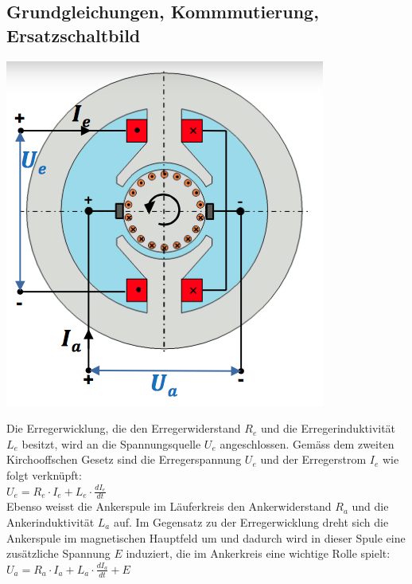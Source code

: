 \subsection{Grundgleichungen, Kommmutierung, Ersatzschaltbild}
\begin{minipage}{0.3 \linewidth}
\includegraphics[width = \linewidth]{./Pics/VL45/GSM}
\end{minipage}
\begin{minipage}{0.6\linewidth}
Die Erregerwicklung, die den Erregerwiderstand $R_e$ und die Erregerinduktivität $L_e$ besitzt, wird an die Spannungsquelle $U_e$ angeschlossen. Gemäss dem zweiten Kirchooffschen Gesetz sind die Erregerspannung $U_e$ und der Erregerstrom $I_e$ wie folgt verknüpft: \\

$U_e = R_e \cdot I_e + L_e \cdot \frac{dI_e}{dt}$ \\

Ebenso weisst die Ankerspule im Läuferkreis den Ankerwiderstand $R_a$ und die Ankerinduktivität $L_a$ auf. Im Gegensatz zu der Erregerwicklung dreht sich die Ankerspule im magnetischen Hauptfeld um und dadurch wird in dieser Spule eine zusätzliche Spannung $E$ induziert, die im Ankerkreis eine wichtige Rolle spielt: \\

$U_a = R_a \cdot I_a + L_a \cdot \frac{dI_a}{dt} + E$
\end{minipage}

